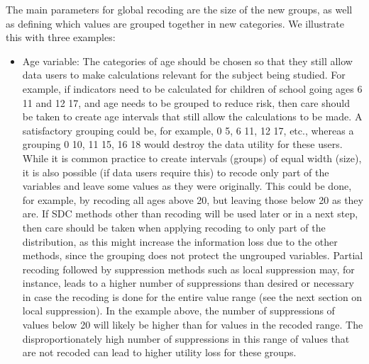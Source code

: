 \documentclass[letterpaper,10pt,english]{sphinxmanual}
\begin{document}
The main parameters for global recoding are the size of the new groups,
as well as defining which values are grouped together in new categories.
 We illustrate this with three examples:
\begin{itemize}
\item {} 
Age variable: The categories of age should be chosen so that they
still allow data users to make calculations relevant for the subject
being studied. For example, if indicators need to be calculated for
children of school going ages 6 \textendash{} 11 and 12 \textendash{} 17, and age needs to be
grouped to reduce risk, then care should be taken to create age
intervals that still allow the calculations to be made. A
satisfactory grouping could be, for example, 0 \textendash{} 5, 6 \textendash{} 11, 12 \textendash{} 17,
etc., whereas a grouping 0 \textendash{} 10, 11 \textendash{} 15, 16 \textendash{} 18 would destroy the
data utility for these users. While it is common practice to create
intervals (groups) of equal width (size), it is also possible (if
data users require this) to recode only part of the variables and
leave some values as they were originally. This could be done, for
example, by recoding all ages above 20, but leaving those below 20 as
they are. If SDC methods other than recoding will be used later or in
a next step, then care should be taken when applying recoding to only
part of the distribution, as this might increase the information loss
due to the other methods, since the grouping does not protect the
ungrouped variables. Partial recoding followed by suppression methods
such as local suppression may, for instance, leads to a higher number
of suppressions than desired or necessary in case the recoding is
done for the entire value range (see the next section on local
suppression). In the example above, the number of suppressions of
values below 20 will likely be higher than for values in the recoded
range. The disproportionately high number of suppressions in this
range of values that are not recoded can lead to higher utility loss
for these groups.


\end{itemize}
\end{document}
